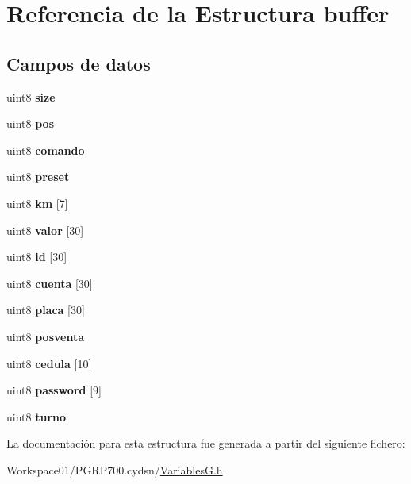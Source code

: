 \hypertarget{structbuffer}{}\section{Referencia de la Estructura buffer}
\label{structbuffer}
\subsection*{Campos de datos}
\begin{DoxyCompactItemize}
\item 
\mbox{\label{structbuffer_abf7f47b9039221e81ecb5eac8f3b090d}} 
uint8 {\bfseries size}
\item 
\mbox{\label{structbuffer_a55f54162334126543740c7f46b68e8ef}} 
uint8 {\bfseries pos}
\item 
\mbox{\label{structbuffer_af74dcab50285c6626969c06412e76e53}} 
uint8 {\bfseries comando}
\item 
\mbox{\label{structbuffer_ad55cfc60d0e5fc2b1b270604303f7183}} 
uint8 {\bfseries preset}
\item 
\mbox{\label{structbuffer_af35812f0b436a6bd305952f2c086f18d}} 
uint8 {\bfseries km} \mbox{[}7\mbox{]}
\item 
\mbox{\label{structbuffer_ae7872cd2130ae3a3b7b420c0d473ad8f}} 
uint8 {\bfseries valor} \mbox{[}30\mbox{]}
\item 
\mbox{\label{structbuffer_a531cb7e6535303f2f6250338b333d8e0}} 
uint8 {\bfseries id} \mbox{[}30\mbox{]}
\item 
\mbox{\label{structbuffer_ad3a80da94e063f40c8332b82be7e6370}} 
uint8 {\bfseries cuenta} \mbox{[}30\mbox{]}
\item 
\mbox{\label{structbuffer_a6af7af8c6b96b6c6e985b11fddfdd3f1}} 
uint8 {\bfseries placa} \mbox{[}30\mbox{]}
\item 
\mbox{\label{structbuffer_a2e612a905833196cd952ab78808787ba}} 
uint8 {\bfseries posventa}
\item 
\mbox{\label{structbuffer_aed8552db81c57154d7bfc96378baab38}} 
uint8 {\bfseries cedula} \mbox{[}10\mbox{]}
\item 
\mbox{\label{structbuffer_abeabd3e6083f7fd6f6b18b950ab9904b}} 
uint8 {\bfseries password} \mbox{[}9\mbox{]}
\item 
\mbox{\label{structbuffer_a5c53efd180268c0ad1aa3c7872f8abdd}} 
uint8 {\bfseries turno}
\end{DoxyCompactItemize}


La documentación para esta estructura fue generada a partir del siguiente fichero\+:\begin{DoxyCompactItemize}
\item 
Workspace01/\+P\+G\+R\+P700.\+cydsn/\mbox{\hyperlink{_variables_g_8h}{Variables\+G.\+h}}\end{DoxyCompactItemize}
